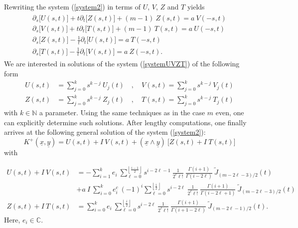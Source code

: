 \documentclass{amsart}
\theoremstyle{remark}
\begin{document}
Rewriting the system (\ref{system2}) in terms of $U$, $V$, $Z$ and $T$ yields
\begin{align}\label{systemUVZT}
\begin{split}
\partial_s \lbrack U(s,t) \rbrack + t \partial_t \lbrack Z(s,t) \rbrack + (m-1) \ Z(s,t)  =  a \ V(-s,t)\\
\partial_s \lbrack V(s,t) \rbrack + t \partial_t \lbrack T(s,t) \rbrack + (m-1) \ T(s,t)  =  a \ U(-s,t)\\
\partial_s \lbrack Z(s,t) \rbrack - \frac{1}{t} \partial_t \lbrack U(s,t) \rbrack    =  a \ T(-s,t)\\
\partial_s \lbrack T(s,t) \rbrack - \frac{1}{t} \partial_t \lbrack V(s,t) \rbrack    =  a \ Z(-s,t).
\end{split}
\end{align}
We are interested in solutions of the system (\ref{systemUVZT}) of the following form
\begin{align*}
U(s,t) &=  \sum_{j=0}^k s^{k-j} \ U_j(t) \quad , \quad V(s,t)  =  \sum_{j=0}^k s^{k-j} \ V_j(t)\\
Z(s,t) &=  \sum_{j=0}^k s^{k-j} \ Z_j(t) \quad , \quad T(s,t)  =  \sum_{j=0}^k s^{k-j} \ T_j(t)
\end{align*}
with $k \in \mathbb{N}$ a parameter. Using the same techniques as in the case $m$ even, one can explicitly determine such solutions. After lengthy computations, one finally arrives at the following general solution of the system (\ref{system2}):
\begin{displaymath}
K^+({\underline{x}},{\underline{y}})  =  U(s,t) + I \ V(s,t) +  ({\underline{x}} \wedge {\underline{y}}) \ \lbrack Z(s,t) + I \ T(s,t) \rbrack
\end{displaymath}
with

\begin{align*}
U(s,t) + I \ V(s,t)  &=  - \sum_{i = 1}^{k} e_{i} \  \sum_{\ell =0}^{\left\lfloor  \frac{i-1}{2} \right\rfloor} s^{i-2 \ell-1} \ \frac{1}{2^{\ell} \ell!} \ \frac{\Gamma(i+1)}{\Gamma(i-2\ell)} \ \widetilde{J}_{(m-2\ell-3)/2}(t)\\
 & + a \  I \ \sum_{i = 0}^{k} e_{i}^c \ (-1)^{i}  \sum_{\ell =0}^{\left\lfloor  \frac{i}{2}\right\rfloor} s^{i-2\ell} \ \frac{1}{2^{\ell} \ell!} \ \frac{\Gamma(i+1)}{\Gamma(i-2\ell+1)} \ \widetilde{J}_{(m-2\ell-3)/2}(t)\\
Z(s,t) + I \ T(s,t)  &=  \sum_{i=0}^k e_i \ \sum_{\ell=0}^{\left\lfloor  \frac{i}{2} \right\rfloor} s^{i-2\ell} \ \frac{1}{2^{\ell} \ell!} \ \frac{\Gamma(i+1)}{\Gamma(i+1-2\ell)} \ \widetilde{J}_{(m-2\ell-1)/2}(t).
\end{align*} 
Here, $e_i \in \mathbb{C}$.
\end{document}
